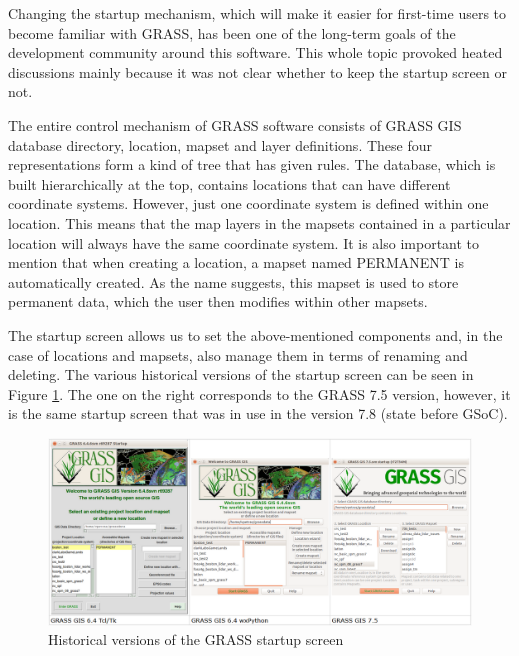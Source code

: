 \documentclass[a4paper,10pt,twoside]{article}
\begin{document}
\noindent Changing the startup mechanism, which will make it easier for first-time users to become familiar with GRASS, has been one of the long-term goals of the development community around this software. This whole topic provoked heated discussions mainly because it was not clear whether to keep the startup screen or not.

The entire control mechanism of GRASS software consists of GRASS GIS database directory, location, mapset and layer definitions. These four representations form a kind of tree that has given rules. The database, which is built hierarchically at the top, contains locations that can have different coordinate systems. However, just one coordinate system is defined within one location. This means that the map layers in the mapsets contained in a particular location will always have the same coordinate system. It is also important to mention that when creating a location, a mapset named PERMANENT is automatically created. As the name suggests, this mapset is used to store permanent data, which the user then modifies within other mapsets.

The startup screen allows us to set the above-mentioned components and, in the case of locations and mapsets, also manage them in terms of renaming and deleting. The various historical versions of the startup screen can be seen in Figure \ref{fig:verze_startup}. The one on the right corresponds to the GRASS 7.5 version, however, it is the same startup screen that was in use in the version 7.8 (state before GSoC).  


\vspace{0.3cm}
\begin{figure}[hbt!]
\begin{center}
\includegraphics[width=15cm]{pictures/verze_startup.png} 
\caption[Historical versions of the GRASS startup screen]{Historical versions of the GRASS startup screen}
\label{fig:verze_startup}
\end{center}
\end{figure}
\end{document}
